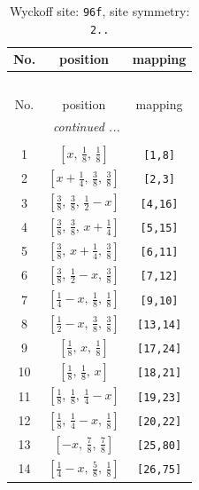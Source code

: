 \documentclass[fleqn,8pt]{jsarticle}
\begin{document}
\begin{longtable}{ccc}
\caption{Wyckoff site: {\tt 96f}, site symmetry: {\tt 2..}}
 \\
 \hline \hline
No. & position & mapping \\ \hline \endfirsthead

\multicolumn{2}{l}{\tablename\ \thetable{}} \\
 \hline \hline
No. & position & mapping \\ \hline \endhead

 \hline \hline
\multicolumn{2}{r}{\footnotesize\it continued ...} \\ \endfoot

 \hline \hline
\multicolumn{2}{r}{} \\ \endlastfoot

1 & $\left[ x,\, \frac{1}{8},\, \frac{1}{8} \right]$ & {\tt [1,8]} \\ \hline
2 & $\left[ x + \frac{1}{4},\, \frac{3}{8},\, \frac{3}{8} \right]$ & {\tt [2,3]} \\ \hline
3 & $\left[ \frac{3}{8},\, \frac{3}{8},\, \frac{1}{2} - x \right]$ & {\tt [4,16]} \\ \hline
4 & $\left[ \frac{3}{8},\, \frac{3}{8},\, x + \frac{1}{4} \right]$ & {\tt [5,15]} \\ \hline
5 & $\left[ \frac{3}{8},\, x + \frac{1}{4},\, \frac{3}{8} \right]$ & {\tt [6,11]} \\ \hline
6 & $\left[ \frac{3}{8},\, \frac{1}{2} - x,\, \frac{3}{8} \right]$ & {\tt [7,12]} \\ \hline
7 & $\left[ \frac{1}{4} - x,\, \frac{1}{8},\, \frac{1}{8} \right]$ & {\tt [9,10]} \\ \hline
8 & $\left[ \frac{1}{2} - x,\, \frac{3}{8},\, \frac{3}{8} \right]$ & {\tt [13,14]} \\ \hline
9 & $\left[ \frac{1}{8},\, x,\, \frac{1}{8} \right]$ & {\tt [17,24]} \\ \hline
10 & $\left[ \frac{1}{8},\, \frac{1}{8},\, x \right]$ & {\tt [18,21]} \\ \hline
11 & $\left[ \frac{1}{8},\, \frac{1}{8},\, \frac{1}{4} - x \right]$ & {\tt [19,23]} \\ \hline
12 & $\left[ \frac{1}{8},\, \frac{1}{4} - x,\, \frac{1}{8} \right]$ & {\tt [20,22]} \\ \hline
13 & $\left[ - x,\, \frac{7}{8},\, \frac{7}{8} \right]$ & {\tt [25,80]} \\ \hline
14 & $\left[ \frac{1}{4} - x,\, \frac{5}{8},\, \frac{1}{8} \right]$ & {\tt [26,75]} \\ \hline

\end{longtable}
\end{document}
